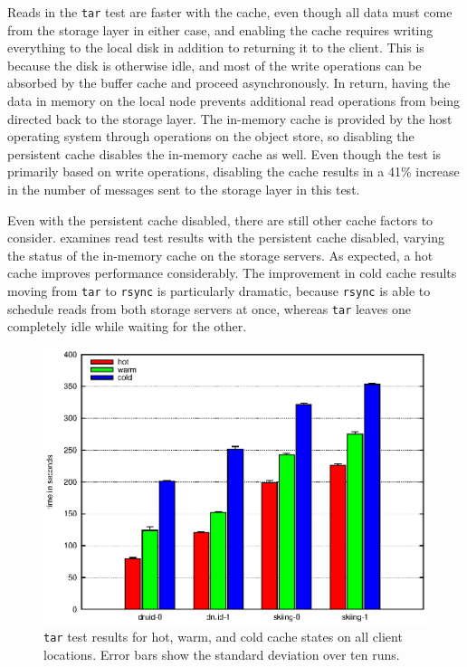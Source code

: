 Reads in the \texttt{tar} test are faster with the cache, even though all data must come from the storage layer in either case, and enabling the cache requires writing everything to the local disk in addition to returning it to the client. This is because the disk is otherwise idle, and most of the write operations can be absorbed by the buffer cache and proceed asynchronously. In return, having the data in memory on the local node prevents additional read operations from being directed back to the storage layer. The in-memory cache is provided by the host operating system through operations on the object store, so disabling the persistent cache disables the in-memory cache as well. Even though the test is primarily based on write operations, disabling the cache results in a 41\% increase in the number of messages sent to the storage layer in this test.

Even with the persistent cache disabled, there are still other cache factors to consider.  examines read test results with the persistent cache disabled, varying the status of the in-memory cache on the storage servers. As expected, a hot cache improves performance considerably. The improvement in cold cache results moving from \texttt{tar} to \texttt{rsync} is particularly dramatic, because \texttt{rsync} is able to schedule reads from both storage servers at once, whereas \texttt{tar} leaves one completely idle while waiting for the other.

\begin{figure}[t]
\centering
\includegraphics[width=\figwidth]{figures/envoy-tar}
\caption[The \texttt{tar} test with all cache modes]{\texttt{tar} test results for hot, warm, and cold cache states on all client locations. Error bars show the standard deviation over ten runs.}
\label{fig:envoy-tar}
\end{figure}

